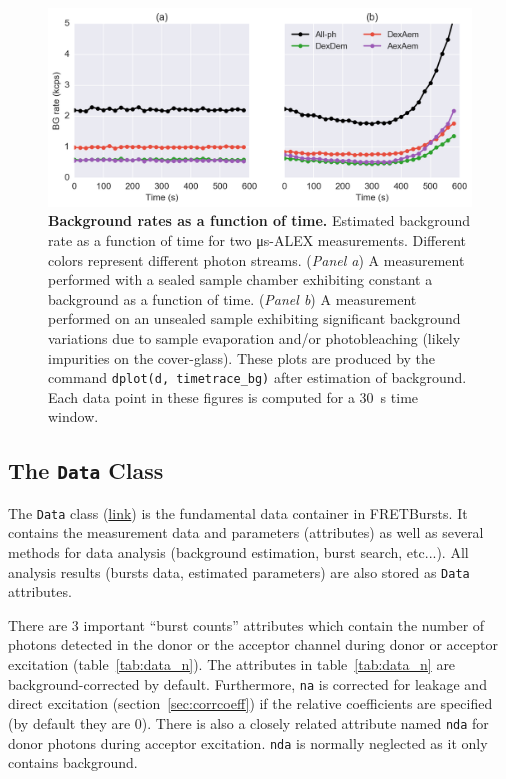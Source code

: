 \documentclass[10pt,letterpaper]{article}
\begin{document}
\begin{figure}[h!]
\begin{center}
\includegraphics[width=0.91\columnwidth]{figures/background_timetrace/background_timetrace}
\caption{\label{fig:bg_timetrace} \textbf{Background rates as a function of time.}
Estimated background rate as a function of time for two μs-ALEX measurements. 
Different colors represent different photon streams.
(\textit{Panel a}) A measurement performed with a sealed sample chamber
exhibiting constant a background as a function of time.
(\textit{Panel b}) A measurement performed on an unsealed sample exhibiting
significant background variations due to sample evaporation and/or
photobleaching (likely impurities on the cover-glass).
These plots are produced by the command
\texttt{dplot(d, timetrace\_bg)} after estimation of background.
Each data point in these figures is computed for a 30~s time window.%
}
\end{center}
\end{figure}


\subsection{The \texttt{Data} Class}
\label{sec:data_intro}

The \verb|Data| class
(\href{http://fretbursts.readthedocs.org/en/latest/data_class.html}{link})
is the fundamental data container in FRETBursts. It contains the
measurement data and parameters (attributes) as well as several methods
for data analysis (background estimation, burst search, etc...).
All analysis results (bursts data, estimated parameters) are also stored
as \verb|Data| attributes.

There are 3 important ``burst counts'' attributes which contain
the number of photons detected in the donor or the acceptor channel
during donor or acceptor excitation (table~\ref{tab:data_n}).
The attributes in table~\ref{tab:data_n} are background-corrected by default.
Furthermore, \verb|na| is corrected for leakage and direct excitation
(section~\ref{sec:corrcoeff}) if the relative coefficients are specified
(by default they are 0).
There is also a closely related attribute named \verb|nda| for donor photons
during acceptor excitation. \verb|nda| is normally neglected as it only contains
background.
\end{document}
